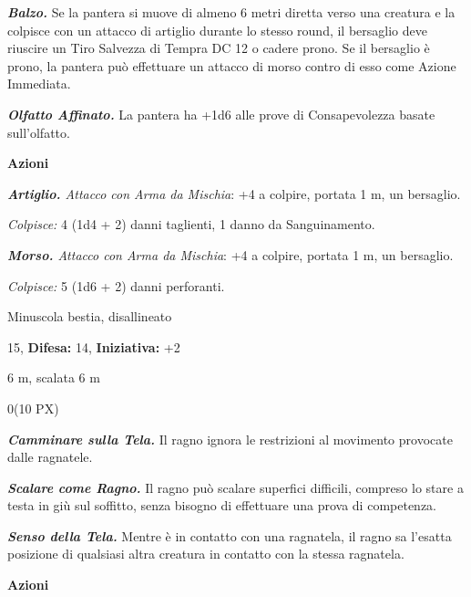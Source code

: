 \begin{multicols}{2}
{\emph{\textbf{Balzo.}} Se la pantera si muove di almeno 6 metri diretta verso una creatura e la colpisce con un attacco di artiglio durante lo stesso round, il bersaglio deve riuscire un Tiro Salvezza di Tempra DC 12 o cadere prono. Se il bersaglio è prono, la pantera può effettuare un attacco di morso contro di esso come Azione Immediata.

\emph{\textbf{Olfatto Affinato.}} La pantera ha +1d6 alle prove di Consapevolezza basate sull'olfatto.

\textbf{Azioni}

\emph{\textbf{Artiglio.} Attacco con Arma da Mischia}: +4 a colpire, portata 1 m, un bersaglio.

\emph{Colpisce:} 4 (1d4 + 2) danni taglienti, 1 danno da Sanguinamento.

\emph{\textbf{Morso.} Attacco con Arma da Mischia}: +4 a colpire, portata 1 m, un bersaglio.

\emph{Colpisce:} 5 (1d6 + 2) danni perforanti.

\begin{description}[noitemsep, topsep=0pt, parsep=0pt, partopsep=0pt, leftmargin=0cm, labelwidth=2.2cm]
    \item[\textbf{Taglia/Tipo:}] Minuscola bestia, disallineato
    \item[\textbf{Caratt.:}] 
    \item[\textbf{Punti Ferita:}] 15,  \textbf{Difesa:} 14,  \textbf{Iniziativa:} +2
    \item[\textbf{Tiri Salvez.:}] 
    \item[\textbf{Movimento:}] 6 m, scalata 6 m
    \item[\textbf{Sfida:}] 0(10 PX)\smallskip
\end{description}

\emph{\textbf{Camminare sulla Tela.}} Il ragno ignora le restrizioni al movimento provocate dalle ragnatele.

\emph{\textbf{Scalare come Ragno.}} Il ragno può scalare superfici difficili, compreso lo stare a testa in giù sul soffitto, senza bisogno di effettuare una prova di competenza.

\emph{\textbf{Senso della Tela.}} Mentre è in contatto con una ragnatela, il ragno sa l'esatta posizione di qualsiasi altra creatura in contatto con la stessa ragnatela.

\textbf{Azioni}

}
\end{multicols}
